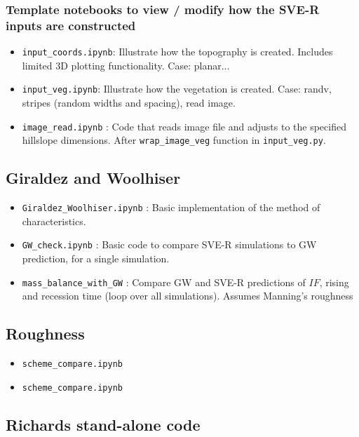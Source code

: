 \documentclass{article}
\newcommand{\code}[1]{\texttt{#1}}
\begin{document}
\subsubsection*{Template notebooks to view / modify how the SVE-R inputs are constructed}
\begin{itemize}
	\item \code{input\_coords.ipynb}:  Illustrate how the topography is created. Includes limited 3D plotting functionality. Case: planar...
	\item \code{input\_veg.ipynb}:  Illustrate how the vegetation is created. Case: randv, stripes (random widths and spacing), read image.
	\item \code{image\_read.ipynb} : Code that reads image file and adjusts to the specified hillslope dimensions.  After \code{wrap\_image\_veg} function in \code{input\_veg.py}.
\end{itemize}



\subsection{Giraldez and Woolhiser }
\begin{itemize}
	\item \code{Giraldez\_Woolhiser.ipynb} : Basic implementation of the method of characteristics.
	\item \code{GW\_check.ipynb} : Basic code to compare SVE-R simulations to GW prediction, for a single simulation.  
	\item \code{mass\_balance\_with\_GW} : Compare GW and SVE-R predictions of $IF$, rising and recession time (loop over all simulations).  
	\subitem Assumes Manning's roughness
\end{itemize}

\subsection{Roughness}
\begin{itemize}
	\item \code{scheme\_compare.ipynb}
	\item \code{scheme\_compare.ipynb}
\end{itemize}



\subsection{Richards stand-alone code}
\end{document}
